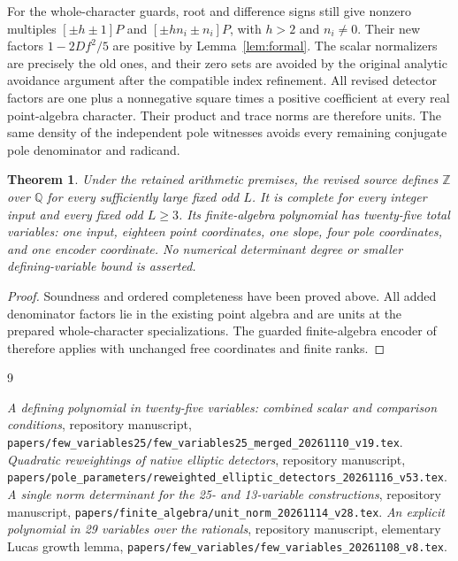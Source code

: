 \documentclass[11pt,a4paper]{article}
\newtheorem{theorem}{Theorem}[section]
\newcommand{\Q}{\mathbb Q}\newcommand{\Z}{\mathbb Z}
\begin{document}
For the whole-character guards, root and difference signs still give
nonzero multiples \([\pm h\pm1]P\) and
\([\pm hn_i\pm n_i]P\), with \(h>2\) and \(n_i\ne0\).
Their new factors \(1-2Df^2/5\) are positive by
Lemma~\ref{lem:formal}. The scalar normalizers are precisely the old
ones, and their zero sets are avoided by the original analytic
avoidance argument after the compatible index refinement.
All revised detector factors are one plus a nonnegative square times
a positive coefficient at every real point-algebra character.
Their product and trace norms are therefore units.
The same density of the independent pole witnesses avoids every
remaining conjugate pole denominator and radicand.

\begin{theorem}
Under the retained arithmetic premises, the revised source defines
\(\Z\) over \(\Q\) for every sufficiently large fixed odd \(L\).
It is complete for every integer input and every fixed odd \(L\ge3\).
Its finite-algebra polynomial has twenty-five total variables:
one input, eighteen point coordinates, one slope, four pole coordinates,
and one encoder coordinate. No numerical determinant degree or smaller
defining-variable bound is asserted.
\end{theorem}
\begin{proof}
Soundness and ordered completeness have been proved above.
All added denominator factors lie in the existing point algebra and
are units at the prepared whole-character specializations. The guarded
finite-algebra encoder of \cite{Unit} therefore applies with unchanged
free coordinates and finite ranks.
\end{proof}

\begin{thebibliography}{9}\raggedright
{}\emph{A defining polynomial in twenty-five variables:
combined scalar and comparison conditions}, repository manuscript,
\nolinkurl{papers/few_variables25/few_variables25_merged_20261110_v19.tex}.
\emph{Quadratic reweightings of native elliptic detectors},
repository manuscript,
\nolinkurl{papers/pole_parameters/reweighted_elliptic_detectors_20261116_v53.tex}.
\emph{A single norm determinant for the 25- and 13-variable constructions},
repository manuscript,
\nolinkurl{papers/finite_algebra/unit_norm_20261114_v28.tex}.
\emph{An explicit polynomial in 29 variables over the rationals},
repository manuscript, elementary Lucas growth lemma,
\nolinkurl{papers/few_variables/few_variables_20261108_v8.tex}.
\end{thebibliography}
\end{document}
